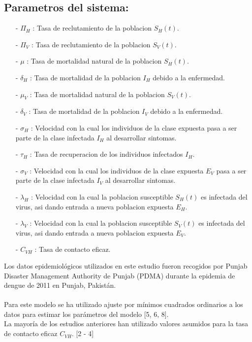 		\subsection{\textbf{Parametros del sistema:}}
			\begin{enumerate}
				\item[-]
				$\Pi_H$ :  Tasa de reclutamiento de la poblacion $S_H (t)$.
				\item[-]
				$\Pi_V$ :  Tasa de reclutamiento de la poblacion $S_V (t)$.
				\item[-]
				$\mu$ : Tasa de mortalidad natural de la poblacion $S_H (t)$.
				\item[-]
				$\delta_H$ : Tasa de mortalidad de la poblacion $I_H$ debido a la enfermedad.
				\item[-]
				$\mu_V$ : Tasa de mortalidad natural de la poblacion $S_V (t)$.
				\item[-]
				$\delta_V$ : Tasa de mortalidad de la poblacion $I_V$ debido a la enfermedad.
				\item[-]
				$\sigma_H$ : Velocidad con la cual los individuos de la clase expuesta pasa a ser parte de la clase infectada $I_H$ al desarrollar sintomas.
				\item[-]
				$\tau_H$ : Tasa de recuperacion de los individuos infectados $I_H$.
				\item[-]
				$\sigma_V$ : Velocidad con la cual los individuos de la clase expuesta $E_V$ pasa a ser parte de la clase infectada $I_V$ al desarrollar sintomas.
				\item[-]
				$\lambda_H$ : Velocidad con la cual la poblacion susceptible $S_H(t)$ es infectada del virus, asi dando entrada a nueva poblacion expuesta $E_H$.
				\item[-]
				$\lambda_V$ : Velocidad con la cual la poblacion susceptible $S_V(t)$ es infectada del virus, asi dando entrada a nueva poblacion expuesta $E_V$.
				\item[-]
				$C_{VH}$ : Tasa de contacto eficaz.
			\end{enumerate}	
			Los datos epidemiológicos utilizados en este estudio fueron recogidos por Punjab Disaster Management Authority de Punjab (PDMA) durante la epidemia de dengue de 2011 en Punjab, Pakistán.\\
			\\
			Para este modelo se ha utilizado ajuste por mínimos cuadrados ordinarios a los datos  para estimar los parámetros del modelo [5, 6, 8].\\
			La mayoría de los estudios anteriores han utilizado valores asumidos para la tasa de contacto eficaz $C_{VH}$. [2 - 4]\\
